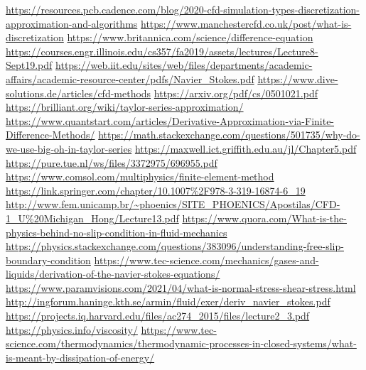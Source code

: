 \documentclass{article}
\begin{document}
\begin{thebibliography}{3}
\url{https://resources.pcb.cadence.com/blog/2020-cfd-simulation-types-discretization-approximation-and-algorithms}
\url{https://www.manchestercfd.co.uk/post/what-is-discretization}
\url{https://www.britannica.com/science/difference-equation}
\url{https://courses.engr.illinois.edu/cs357/fa2019/assets/lectures/Lecture8-Sept19.pdf}
\url{https://web.iit.edu/sites/web/files/departments/academic-affairs/academic-resource-center/pdfs/Navier_Stokes.pdf}
\url{https://www.dive-solutions.de/articles/cfd-methods}
\url{https://arxiv.org/pdf/cs/0501021.pdf}
\url{https://brilliant.org/wiki/taylor-series-approximation/}
\url{https://www.quantstart.com/articles/Derivative-Approximation-via-Finite-Difference-Methods/}
\url{https://math.stackexchange.com/questions/501735/why-do-we-use-big-oh-in-taylor-series}
\url{https://maxwell.ict.griffith.edu.au/jl/Chapter5.pdf}
\url{https://pure.tue.nl/ws/files/3372975/696955.pdf}
\url{https://www.comsol.com/multiphysics/finite-element-method}
\url{https://link.springer.com/chapter/10.1007\%2F978-3-319-16874-6\_19}
\url{http://www.fem.unicamp.br/~phoenics/SITE_PHOENICS/Apostilas/CFD-1_U\%20Michigan_Hong/Lecture13.pdf}
\url{https://www.quora.com/What-is-the-physics-behind-no-slip-condition-in-fluid-mechanics}
\url{https://physics.stackexchange.com/questions/383096/understanding-free-slip-boundary-condition}
\url{https://www.tec-science.com/mechanics/gases-and-liquids/derivation-of-the-navier-stokes-equations/}
\url{https://www.paramvisions.com/2021/04/what-is-normal-stress-shear-stress.html}
\url{http://ingforum.haninge.kth.se/armin/fluid/exer/deriv_navier_stokes.pdf}
\url{https://projects.iq.harvard.edu/files/ac274_2015/files/lecture2_3.pdf}
\url{https://physics.info/viscosity/}
\url{https://www.tec-science.com/thermodynamics/thermodynamic-processes-in-closed-systems/what-is-meant-by-dissipation-of-energy/}

\end{thebibliography}
\end{document}
